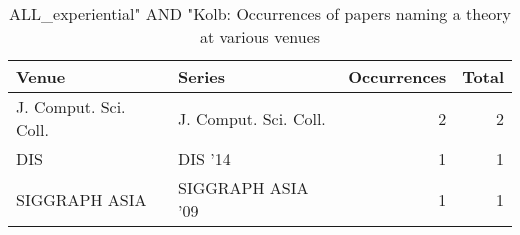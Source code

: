\begin{table*}[t]
\begin{tabular}{llrr}
Venue & Series & Occurrences & Total\\\hline
\multirow{1}{*}{J. Comput. Sci. Coll.} & J. Comput. Sci. Coll. & 2 & \multirow{1}{*}{2}\\
\multirow{1}{*}{DIS } & DIS '14 & 1 & \multirow{1}{*}{1}\\
\multirow{1}{*}{SIGGRAPH ASIA } & SIGGRAPH ASIA '09 & 1 & \multirow{1}{*}{1}\\
\end{tabular}
\caption{ALL\_experiential" AND "Kolb: Occurrences of papers naming a theory at various venues}
\end{table*}